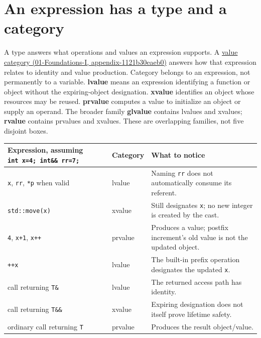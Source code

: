 \section{An expression has a type and a category}\label{05-engine-i-ch003-an-expression-has-a-type-and-a-category}

A type answers what operations and values an expression supports. A \href{../01-Foundations-I/main.pdf\#nameddest=appendix-1121b30eaeb0}{value category (01-Foundations-I, appendix-1121b30eaeb0)} answers how that expression relates to identity and value production. Category belongs to an expression, not permanently to a variable. \textbf{lvalue} means an expression identifying a function or object without the expiring-object designation. \textbf{xvalue} identifies an object whose resources may be reused. \textbf{prvalue} computes a value to initialize an object or supply an operand. The broader family \textbf{glvalue} contains lvalues and xvalues; \textbf{rvalue} contains prvalues and xvalues. These are overlapping families, not five disjoint boxes.

{\def\LTcaptype{none} %
\begin{longtable}[]{@{}
  >{\raggedright\arraybackslash}p{}
  >{\raggedright\arraybackslash}p{}
  >{\raggedright\arraybackslash}p{}@{}}
\toprule\noalign{}
\begin{minipage}[b]{\linewidth}\raggedright
Expression, assuming \texttt{int\ x=4;\ int\&\&\ rr=7;}
\end{minipage} & \begin{minipage}[b]{\linewidth}\raggedright
Category
\end{minipage} & \begin{minipage}[b]{\linewidth}\raggedright
What to notice
\end{minipage} \\
\midrule\noalign{}
\endhead
\bottomrule\noalign{}
\endlastfoot
\texttt{x}, \texttt{rr}, \texttt{*p} when valid & lvalue & Naming \texttt{rr} does not automatically consume its referent. \\
\texttt{std::move(x)} & xvalue & Still designates \texttt{x}; no new integer is created by the cast. \\
\texttt{4}, \texttt{x+1}, \texttt{x++} & prvalue & Produces a value; postfix increment's old value is not the updated object. \\
\texttt{++x} & lvalue & The built-in prefix operation designates the updated \texttt{x}. \\
call returning \texttt{T\&} & lvalue & The returned access path has identity. \\
call returning \texttt{T\&\&} & xvalue & Expiring designation does not itself prove lifetime safety. \\
ordinary call returning \texttt{T} & prvalue & Produces the result object/value. \\
\end{longtable}
}

